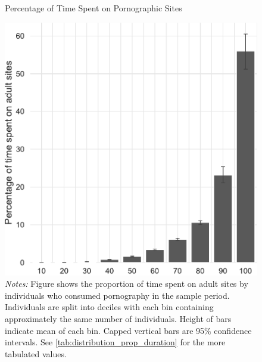 \documentclass[12pt, letterpaper]{article}
\begin{document}
\begin{figure}[ht]
	\centering
	\caption{Percentage of Time Spent on Pornographic Sites}
	\includegraphics[width=.5\linewidth]{../figs/distribution_proportion_duration_on_adultsites.pdf}
	\caption*{\footnotesize \emph{Notes:} 
		Figure shows the proportion of time spent on adult sites by individuals who consumed pornography in the sample period.
		Individuals are split into deciles with each bin containing approximately the same number of individuals.
		Height of bars indicate mean of each bin.
		Capped vertical bars are 95\% confidence intervals.
		See \cref{tab:distribution_prop_duration} for the more tabulated values.
	}
	\label{fig:distribution_prop_duration}
\end{figure}
\end{document}

